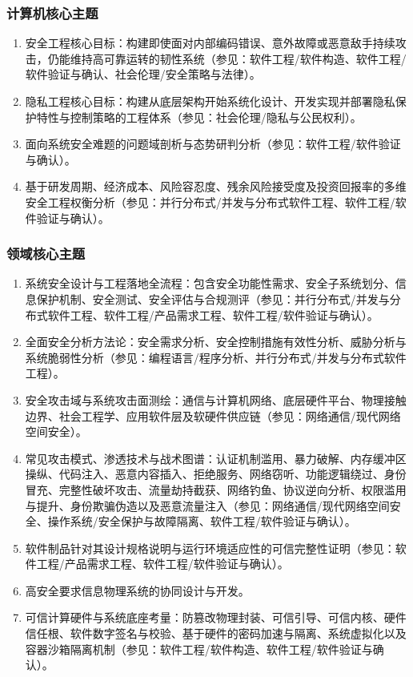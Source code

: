 \subsubsection{计算机核心主题}
\begin{enumerate}\setlength{\itemsep}{0pt}\setlength{\parskip}{0pt}
    \item 安全工程核心目标：构建即使面对内部编码错误、意外故障或恶意敌手持续攻击，仍能维持高可靠运转的韧性系统（参见：软件工程/软件构造、软件工程/软件验证与确认、社会伦理/安全策略与法律）。
    \item 隐私工程核心目标：构建从底层架构开始系统化设计、开发实现并部署隐私保护特性与控制策略的工程体系（参见：社会伦理/隐私与公民权利）。
    \item 面向系统安全难题的问题域剖析与态势研判分析（参见：软件工程/软件验证与确认）。
    \item 基于研发周期、经济成本、风险容忍度、残余风险接受度及投资回报率的多维安全工程权衡分析（参见：并行分布式/并发与分布式软件工程、软件工程/软件验证与确认）。
\end{enumerate}

\subsubsection{领域核心主题}
\begin{enumerate}\setlength{\itemsep}{0pt}\setlength{\parskip}{0pt}\setcounter{enumi}{4}
    \item 系统安全设计与工程落地全流程：包含安全功能性需求、安全子系统划分、信息保护机制、安全测试、安全评估与合规测评（参见：并行分布式/并发与分布式软件工程、软件工程/产品需求工程、软件工程/软件验证与确认）。
    \item 全面安全分析方法论：安全需求分析、安全控制措施有效性分析、威胁分析与系统脆弱性分析（参见：编程语言/程序分析、并行分布式/并发与分布式软件工程）。
    \item 安全攻击域与系统攻击面测绘：通信与计算机网络、底层硬件平台、物理接触边界、社会工程学、应用软件层及软硬件供应链（参见：网络通信/现代网络空间安全）。
    \item 常见攻击模式、渗透技术与战术图谱：认证机制滥用、暴力破解、内存缓冲区操纵、代码注入、恶意内容插入、拒绝服务、网络窃听、功能逻辑绕过、身份冒充、完整性破坏攻击、流量劫持截获、网络钓鱼、协议逆向分析、权限滥用与提升、身份欺骗伪造以及恶意流量注入（参见：网络通信/现代网络空间安全、操作系统/安全保护与故障隔离、软件工程/软件验证与确认）。
    \item 软件制品针对其设计规格说明与运行环境适应性的可信完整性证明（参见：软件工程/产品需求工程、软件工程/软件验证与确认）。
    \item 高安全要求信息物理系统的协同设计与开发。
    \item 可信计算硬件与系统底座考量：防篡改物理封装、可信引导、可信内核、硬件信任根、软件数字签名与校验、基于硬件的密码加速与隔离、系统虚拟化以及容器沙箱隔离机制（参见：软件工程/软件构造、软件工程/软件验证与确认）。
\end{enumerate}

